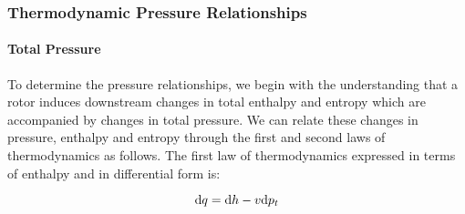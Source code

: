 %
%
%



\subsubsection{Thermodynamic Pressure Relationships}
\label{ssec:pressure}

\paragraph{Total Pressure}


To determine the pressure relationships, we begin with the understanding that a rotor induces downstream changes in total enthalpy and entropy which are accompanied by changes in total pressure.
%
We can relate these changes in pressure, enthalpy and entropy through the first and second laws of thermodynamics as follows.
%
The first law of thermodynamics expressed in terms of enthalpy and in differential form is:

\begin{equation}
    \label{eqn:firstlaw}
    \mathrm{d} q = \mathrm{d} h - v\mathrm{d} p_t
\end{equation}

